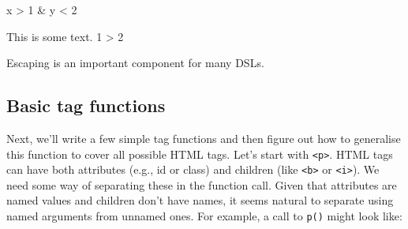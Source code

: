 \begin{Shaded}
\begin{Highlighting}[]
\NormalTok{(}\NormalTok{)}
\end{Highlighting}
\end{Shaded}

x \textgreater{} 1 \& y \textless{} 2

\begin{Shaded}
\begin{Highlighting}[]
\NormalTok{(}\NormalTok{(}\NormalTok{))}
\end{Highlighting}
\end{Shaded}

This is some text. 1 \textgreater{} 2

\begin{Shaded}
\begin{Highlighting}[]
\NormalTok{(}\NormalTok{(}\NormalTok{))}
\end{Highlighting}
\end{Shaded}

Escaping is an important component for many DSLs.

\hypertarget{basic-tag-functions}{%
\subsection{Basic tag functions}\label{basic-tag-functions}}

Next, we'll write a few simple tag functions and then figure out how to
generalise this function to cover all possible HTML tags. Let's start
with \texttt{\textless{}p\textgreater{}}. HTML tags can have both
attributes (e.g., id or class) and children (like
\texttt{\textless{}b\textgreater{}} or
\texttt{\textless{}i\textgreater{}}). We need some way of separating
these in the function call. Given that attributes are named values and
children don't have names, it seems natural to separate using named
arguments from unnamed ones. For example, a call to \texttt{p()} might
look like:

\begin{Shaded}
\begin{Highlighting}[]
\NormalTok{(}\NormalTok{, }\NormalTok{(}\NormalTok{), } \NormalTok{)}
\end{Highlighting}
\end{Shaded}

